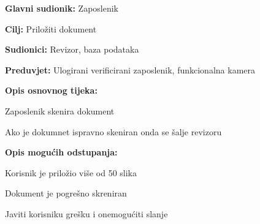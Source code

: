 				\noindent {}
				\begin{packed_item}
					
					\item \textbf{Glavni sudionik:} Zaposlenik
					\item  \textbf{Cilj:} Priložiti dokument
					\item  \textbf{Sudionici:} Revizor, baza podataka
					\item  \textbf{Preduvjet:} Ulogirani verificirani zaposlenik, funkcionalna kamera
					\item  \textbf{Opis osnovnog tijeka:}
					
					\item[] \begin{packed_enum}
						
						
						\item Zaposlenik skenira dokument
						\item Ako je dokumnet ispravno skeniran onda se šalje revizoru
					\end{packed_enum}
					
					\item  \textbf{Opis mogućih odstupanja:}
					
					\item[] \begin{packed_item}
						
						\item[2.a] Korisnik je priložio više od 50 slika
						\item[2.b] Dokument je pogrešno skreniran
						\item[] \begin{packed_enum}
							
							\item Javiti korisniku grešku i onemogućiti slanje
							
						\end{packed_enum}
						
					\end{packed_item}
				\end{packed_item}
				
